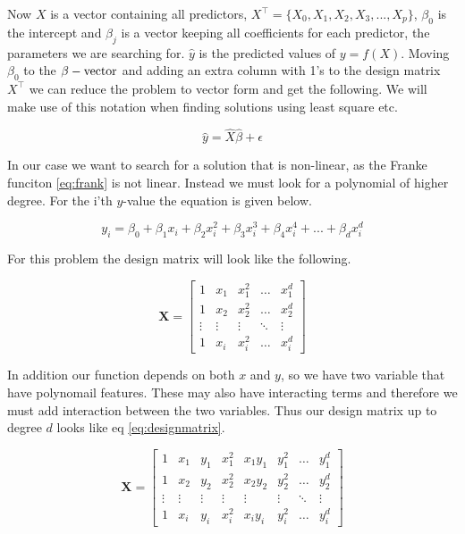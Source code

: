 \documentclass[a4paper,12pt, english]{article}
\begin{document}
Now $X$ is a vector containing all predictors, $X^{\top} = \{X_0, X_1, X_2, X_3,..., X_p\}$, $\beta_0$ is the intercept and $\beta_j$ is a vector keeping all coefficients for each predictor, the parameters we are searching for. $\hat{y}$ is the predicted values of $y = f(X)$. Moving $\beta_0$ to the $\beta-\textnormal{vector}$ and adding an extra column with 1's to the design matrix $X^{\top}$ we can reduce the problem to vector form and get the following. We will make use of this notation when finding solutions using least square etc. 

\begin{equation}
\hat{y} = \hat{X} \hat{\beta} + \epsilon
\end{equation}

In our case we want to search for a solution that is non-linear, as the Franke funciton \ref{eq:frank} is not linear. Instead we must look for a polynomial of higher degree. For the i'th $y$-value the equation is given below.

\begin{equation}
y_i = \beta_0 + \beta_1 x_i + \beta_2 x_i^{2} + \beta_3 x_i^{3} + \beta_4 x_i^{4} + ... + \beta_d x_i^{d}
\end{equation}

For this problem the design matrix will look like the following.

\begin{equation}
\mathbf{X} = 
\begin{bmatrix}
1 & x_1 & x_1^2 & \dots  & x_1^d \\
1 & x_2 & x_2^2 & \dots  & x_2^d \\
\vdots & \vdots & \vdots & \ddots & \vdots \\
1 & x_i & x_i^2 & \dots  & x_i^d
\end{bmatrix}
\end{equation}

In addition our function depends on both $x$ and $y$, so we have two variable that have polynomail features. These may also have interacting terms and therefore we must add interaction between the two variables. Thus our design matrix up to degree $d$ looks like eq \ref{eq:designmatrix}.

\begin{equation}\label{eq:designmatrix}
\mathbf{X} = 
\begin{bmatrix}
1 & x_1 & y_1 & x_1^2 & x_1y_1 & y_1^2 & \dots  & y_1^d \\
1 & x_2 & y_2 & x_2^2 & x_2y_2 & y_2^2 & \dots  & y_2^d \\
\vdots & \vdots & \vdots & \vdots & \vdots & \vdots & \ddots & \vdots \\
1 & x_i & y_i & x_i^2 & x_iy_i & y_i^2 & \dots  & y_i^d
\end{bmatrix}
\end{equation}
\end{document}
